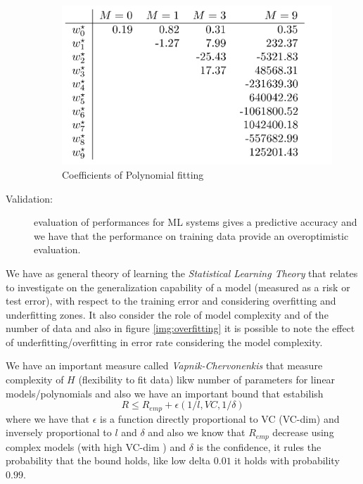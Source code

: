 \begin{description}
			    \begin{figure}
				\caption{Coefficients of Polynomial fitting}
				\label{img:coefficients}
				\includegraphics[width=\textwidth]{images/coefficients}
			    \end{figure}
    \item [Validation: ] evaluation of performances for ML systems gives a predictive accuracy and we have
                         that the performance on training data provide an overoptimistic evaluation.\newline

\end{description}
We have as general theory of learning the \emph{Statistical Learning Theory} that relates to investigate on the generalization capability of a model 
(measured as a risk or test error), with respect to the training error and considering overfitting and underfitting zones.\newline
It also consider the role of model complexity and of the number of data and also in figure \ref{img:overfitting} it is possible to note the effect
of underfitting/overfitting in error rate considering the model complexity.

We have an important measure called \emph{Vapnik-Chervonenkis} that measure complexity of $H$ (flexibility to fit data) likw number of parameters 
for linear models/polynomials and also we have an important bound that estabilish 
\[ R \leq R_{emp} + \epsilon (1 / l, VC, 1 / \delta) \]
where we have that $\epsilon$ is a function directly proportional to VC (VC-dim) and inversely proportional to $l$ and $\delta$ and also we 
know that $R_{emp}$ decrease using complex models (with high VC-dim ) and $\delta$ is the confidence, it rules the probability that the bound holds, like
low delta $0.01$ it holds with probability $0.99$.

